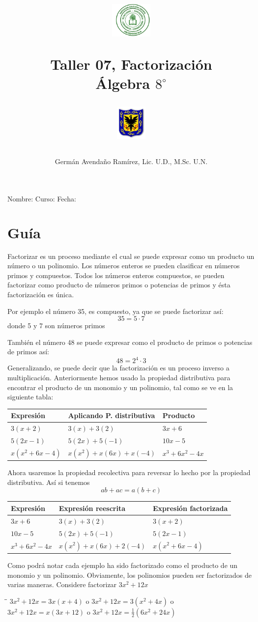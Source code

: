 \documentclass[10pt,twoside]{article}
\author{Germ\'an Avenda\~no Ram\'irez, Lic. U.D., M.Sc. U.N.}
\title{\begin{minipage}{.2\textwidth}
\includegraphics[height=1.75cm]{Images/logo-colegio.png}\end{minipage}
\begin{minipage}{.55\textwidth}
\begin{center}
Taller 07, Factorización  \\
Álgebra $8^{\circ}$
\end{center}
\end{minipage}\hfill
\begin{minipage}{.2\textwidth}
\includegraphics[height=1.75cm]{Images/logo-sed.png} 
\end{minipage}}
\date{}
\begin{document}
\maketitle
Nombre: \hrulefill Curso: \underline{\hspace*{44pt}} Fecha: \underline{\hspace*{2.5cm}}
\section*{Gu\'{i}a}
Factorizar es un proceso mediante el cual se puede expresar como un producto un número o un polinomio. Los números enteros se pueden clasificar en números primos y compuestos. Todos los números enteros compuestos, se pueden factorizar como producto de números primos o potencias de primos y ésta factorización es única.

Por ejemplo el número 35, es compuesto, ya que se puede factorizar así:
\[35=5\cdot 7\]
donde 5 y 7 son números primos

También el número 48 se puede expresar como el producto de primos o potencias de primos así:
\[48=2^{4}\cdot 3\]
Generalizando, se puede decir que la factorización es un proceso inverso a multiplicación. Anteriormente hemos usado la propiedad distributiva para encontrar el producto de un monomio y un polinomio, tal como se ve en la siguiente tabla:
\begin{center}
\begin{tabular}{l|l|l}
\hline 
Expresión & Aplicando P. distributiva & Producto \\ \hline
$3(x+2)$ & $3(x)+3(2)$ & $3x+6$ \\ 
$5(2x-1)$ & $5(2x)+5(-1)$ & $10x-5$ \\ 
$x(x^{2}+6x-4)$ & $x(x^{2})+x(6x)+x(-4)$ & $x^{3}+6x^{2}-4x$ \\ 
\hline 
\end{tabular} 
\end{center}
Ahora usaremos la propiedad recolectiva para reversar lo hecho por la propiedad distributiva. Así si tenemos 
\[ab+ac=a(b+c)\]
\begin{center}
\begin{tabular}{l|l|l}
\hline 
Expresión & Expresión reescrita & Expresión factorizada \\ \hline
$3x+6$ & $3(x)+3(2)$ & $3(x+2)$ \\ 
$10x-5$ & $5(2x)+5(-1)$ & $5(2x-1)$ \\ 
$x^{3}+6x^{2}-4x$ & $x(x^{2})+x(6x)+2(-4)$ & $x(x^{2}+6x-4)$ \\ 
\hline 
\end{tabular} 
\end{center}
Como podrá notar cada ejemplo ha sido factorizado como el producto de un monomio y un polinomio. Obviamente, los polinomios pueden ser factorizados de varias maneras. Considere factorizar $3x^{2}+12x$
\begin{tabbing}
\hspace{3cm}\=\hspace{3cm}\=\kill
$3x^{2}+12x=3x(x+4)$ \> o \> $3x^{2}+12x=3(x^{2}+4x)$ o \\ 
$3x^{2}+12x=x(3x+12)$ \> o \> $3x^{2}+12x=\frac{1}{2}(6x^{2}+24x)$ 
\end{tabbing} 
\end{document}
